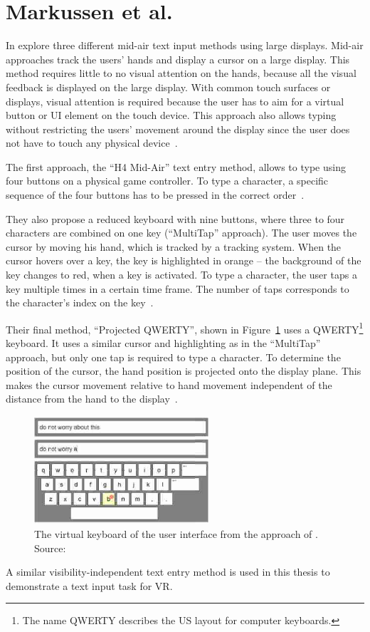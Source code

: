 \section{Markussen et al.}\label{section:markussen-2013}
In {} \citeauthor{Markussen.2013} explore three different mid-air text input methods using large displays. Mid-air approaches track the users' hands and display a cursor on a large display. This method requires little to no visual attention on the hands, because all the visual feedback is displayed on the large display. With common touch surfaces or displays, visual attention is required because the user has to aim for a virtual button or \gls{UI} element on the touch device.
This approach also allows typing without restricting the users' movement around the display since the user does not have to touch any physical device~\cite[401]{Markussen.2013}.

The first approach, the \enquote{H4 Mid-Air} text entry method, allows to type using four buttons on a physical game controller. To type a character, a specific sequence of the four buttons has to be pressed in the correct order~\cite[406]{Markussen.2013}. 

They also propose a reduced keyboard with nine buttons, where three to four characters are combined on one key (\enquote{MultiTap} approach). The user moves the cursor by moving his hand, which is tracked by a tracking system. When the cursor hovers over a key, the key is highlighted in orange -- the background of the key changes to red, when a key is activated. To type a character, the user taps a key multiple times in a certain time frame. The number of taps corresponds to the character's index on the key~\cite[407]{Markussen.2013}. %

Their final method, \enquote{Projected QWERTY}, shown in Figure~\ref{fig:markussen-2013} uses a QWERTY\footnote{The name QWERTY describes the US layout for computer keyboards.} keyboard. It uses a similar cursor and highlighting as in the \enquote{MultiTap} approach, but only one tap is required to type a character. To determine the position of the cursor, the hand position is projected onto the display plane. This makes the cursor movement relative to hand movement independent of the distance from the hand to the display~\cite[408]{Markussen.2013}. 

\begin{figure}[H]%
	\centering%
	\includegraphics[width=6.5cm]{figures/related_work/markussen_2013_keyboard.png}%
  \caption[Virtual keyboard by Markussen et al.]{
  The virtual keyboard of the user interface from the approach of \citeauthor{Markussen.2013}.
  \newline{}
  Source:~\cite[Figure 5]{Markussen.2013}}\label{fig:markussen-2013}
\end{figure}

A similar visibility-independent text entry method is used in this thesis to demonstrate a text input task for \gls{VR}.
